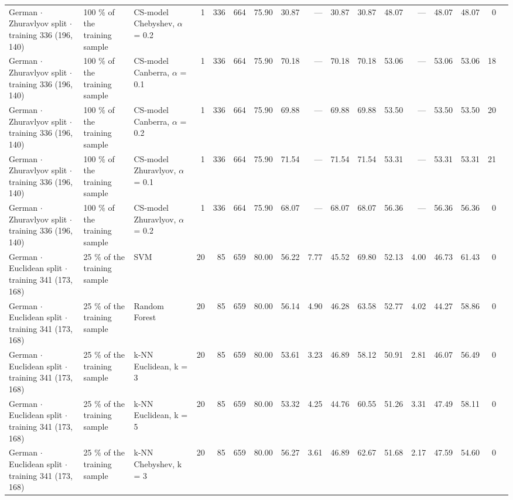 \begin{longtable}{lllrrrrrrrrrrrrrl}
  German $\cdot$ Zhuravlyov split $\cdot$ training 336 (196, 140) & 100 \% of the training sample & CS-model Chebyshev, $\alpha$ = 0.2 & 1 & 336 & 664 & 75.90 & 30.87 & --- & 30.87 & 30.87 & 48.07 & --- & 48.07 & 48.07 & 0 &  \\
  German $\cdot$ Zhuravlyov split $\cdot$ training 336 (196, 140) & 100 \% of the training sample & CS-model Canberra, $\alpha$ = 0.1 & 1 & 336 & 664 & 75.90 & 70.18 & --- & 70.18 & 70.18 & 53.06 & --- & 53.06 & 53.06 & 18 &  \\
  German $\cdot$ Zhuravlyov split $\cdot$ training 336 (196, 140) & 100 \% of the training sample & CS-model Canberra, $\alpha$ = 0.2 & 1 & 336 & 664 & 75.90 & 69.88 & --- & 69.88 & 69.88 & 53.50 & --- & 53.50 & 53.50 & 20 &  \\
  German $\cdot$ Zhuravlyov split $\cdot$ training 336 (196, 140) & 100 \% of the training sample & CS-model Zhuravlyov, $\alpha$ = 0.1 & 1 & 336 & 664 & 75.90 & 71.54 & --- & 71.54 & 71.54 & 53.31 & --- & 53.31 & 53.31 & 21 &  \\
  German $\cdot$ Zhuravlyov split $\cdot$ training 336 (196, 140) & 100 \% of the training sample & CS-model Zhuravlyov, $\alpha$ = 0.2 & 1 & 336 & 664 & 75.90 & 68.07 & --- & 68.07 & 68.07 & 56.36 & --- & 56.36 & 56.36 & 0 &  \\
  German $\cdot$ Euclidean split $\cdot$ training 341 (173, 168) & 25 \% of the training sample & SVM & 20 & 85 & 659 & 80.00 & 56.22 & 7.77 & 45.52 & 69.80 & 52.13 & 4.00 & 46.73 & 61.43 & 0 &  \\
  German $\cdot$ Euclidean split $\cdot$ training 341 (173, 168) & 25 \% of the training sample & Random Forest & 20 & 85 & 659 & 80.00 & 56.14 & 4.90 & 46.28 & 63.58 & 52.77 & 4.02 & 44.27 & 58.86 & 0 &  \\
  German $\cdot$ Euclidean split $\cdot$ training 341 (173, 168) & 25 \% of the training sample & k-NN Euclidean, k = 3 & 20 & 85 & 659 & 80.00 & 53.61 & 3.23 & 46.89 & 58.12 & 50.91 & 2.81 & 46.07 & 56.49 & 0 &  \\
  German $\cdot$ Euclidean split $\cdot$ training 341 (173, 168) & 25 \% of the training sample & k-NN Euclidean, k = 5 & 20 & 85 & 659 & 80.00 & 53.32 & 4.25 & 44.76 & 60.55 & 51.26 & 3.31 & 47.49 & 58.11 & 0 &  \\
  German $\cdot$ Euclidean split $\cdot$ training 341 (173, 168) & 25 \% of the training sample & k-NN Chebyshev, k = 3 & 20 & 85 & 659 & 80.00 & 56.27 & 3.61 & 46.89 & 62.67 & 51.68 & 2.17 & 47.59 & 54.60 & 0 &  \\

\end{longtable}
